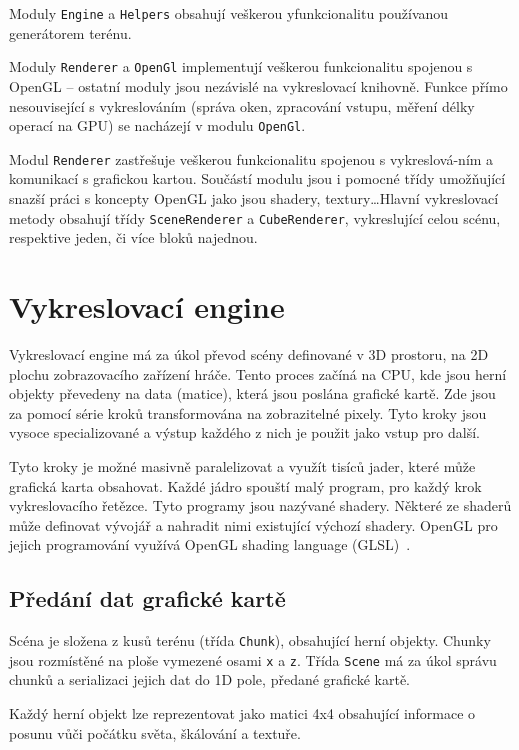 \documentclass[thesis=M,czech]{FITthesis}[2019/12/23]
\begin{document}
Moduly \texttt{Engine} a \texttt{Helpers} obsahují veškerou yfunkcionalitu používanou generátorem terénu. 

Moduly \texttt{Renderer} a \texttt{OpenGl} implementují veškerou funkcionalitu spojenou s OpenGL -- ostatní moduly jsou nezávislé na vykreslovací knihovně. Funkce přímo nesouvisející s vykreslováním (správa oken, zpracování vstupu, měření délky operací na GPU) se nacházejí v modulu \texttt{OpenGl}.

Modul \texttt{Renderer} zastřešuje veškerou funkcionalitu spojenou s vykreslová-ním a komunikací s grafickou kartou. Součástí modulu jsou i pomocné třídy umožňující snazší práci s koncepty OpenGL jako jsou shadery, textury\dots Hlavní vykreslovací metody obsahují třídy \texttt{SceneRenderer} a \texttt{CubeRenderer}, vykreslující celou scénu, respektive jeden, či více bloků najednou.


\chapter{Vykreslovací engine}

Vykreslovací engine má za úkol převod scény definované v 3D prostoru, na 2D plochu zobrazovacího zařízení hráče. Tento proces začíná na CPU, kde jsou herní objekty převedeny na data (matice), která jsou poslána grafické kartě. Zde jsou za pomocí série kroků transformována na zobrazitelné pixely. Tyto kroky jsou vysoce specializované a výstup každého z nich je použit jako vstup pro další. 

Tyto kroky je možné masivně paralelizovat a využít tisíců jader, které může grafická karta obsahovat. Každé jádro spouští malý program, pro každý krok vykreslovacího řetězce. Tyto programy jsou nazývané shadery. Některé ze shaderů může definovat vývojář a nahradit nimi existující výchozí shadery. OpenGL pro jejich programování využívá OpenGL shading language (GLSL)~\cite{lopgl_triangle}.

\section{Předání dat grafické kartě}

Scéna je složena z kusů terénu (třída \texttt{Chunk}), obsahující herní objekty. Chunky jsou rozmístěné na ploše vymezené osami \texttt{x} a \texttt{z}. Třída \texttt{Scene} má za úkol správu chunků a serializaci jejich dat do 1D pole, předané grafické kartě.

Každý herní objekt lze reprezentovat jako matici 4x4 obsahující informace o posunu vůči počátku světa, škálování a textuře.
\end{document}
